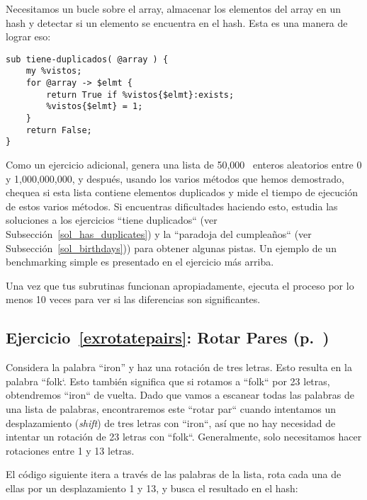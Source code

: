 Necesitamos un bucle sobre el array, almacenar los elementos
del array en un hash y detectar si un elemento se encuentra en 
el hash. Esta es una manera de lograr eso:

\begin{verbatim}
sub tiene-duplicados( @array ) {
    my %vistos;
    for @array -> $elmt {
        return True if %vistos{$elmt}:exists;
        %vistos{$elmt} = 1;
    }
    return False;
}
\end{verbatim}

Como un ejercicio adicional, genera una lista de 50,000~
enteros aleatorios entre 0 y 1,000,000,000, y después, usando
los varios métodos que hemos demostrado, chequea si esta
lista contiene elementos duplicados y mide el tiempo de ejecución
de estos varios métodos. Si encuentras dificultades haciendo esto,
estudia las soluciones a los ejercicios ``tiene duplicados`` 
(ver Subsección~\ref{sol_has_duplicates}) y la
``paradoja del cumpleaños`` (ver Subsección~\ref{sol_birthdays}))
para obtener algunas pistas. Un ejemplo de un benchmarking simple
es presentado en el ejercicio más arriba.

Una vez que tus subrutinas funcionan apropiadamente, ejecuta el proceso
por lo menos 10 veces para ver si las diferencias son significantes.

\subsection{Ejercicio~\ref{exrotatepairs}: Rotar Pares (p.~\pageref{exrotatepairs})}
\label{sol_exrotatepairs}

Considera la palabra ``iron'' y haz una rotación de tres letras.
Esto resulta en la palabra ``folk`. Esto también significa 
que si rotamos a ``folk`` por 23 letras, obtendremos ``iron``
de vuelta. Dado que vamos a escanear todas las palabras de una 
lista de palabras, encontraremos este ``rotar par`` cuando 
intentamos un desplazamiento (\emph{shift}) de tres letras
con ``iron``, así que no hay necesidad de intentar un rotación
de 23 letras con ``folk``. Generalmente, solo necesitamos 
hacer rotaciones entre 1 y 13 letras.

El código siguiente itera a través de las palabras de la lista,
rota cada una de ellas por un desplazamiento 1 y 13, y busca el
resultado en el hash:

